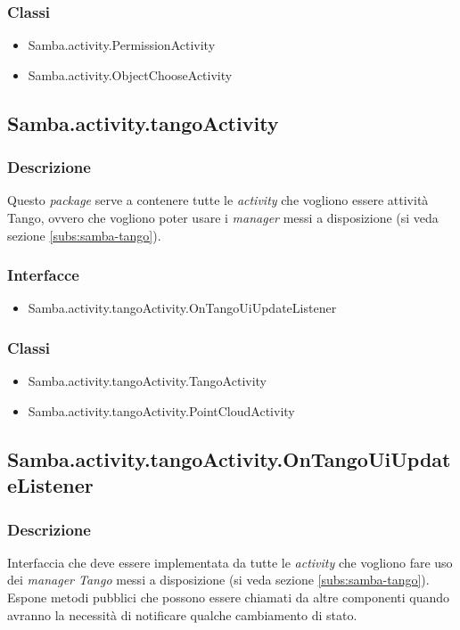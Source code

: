 \subsubsection{Classi}
\begin{itemize}
	\item Samba.activity.PermissionActivity
	\item Samba.activity.ObjectChooseActivity
\end{itemize}

\subsection{Samba.activity.tangoActivity}
\subsubsection{Descrizione}
Questo \emph{package} serve a contenere tutte le \emph{activity} che vogliono essere attività Tango, ovvero che vogliono poter usare i \emph{manager} messi a disposizione (si veda sezione \ref{subs:samba-tango}).
\subsubsection{Interfacce}
\begin{itemize}
	\item Samba.activity.tangoActivity.OnTangoUiUpdateListener
\end{itemize}
\subsubsection{Classi}
\begin{itemize}
	\item Samba.activity.tangoActivity.TangoActivity
	\item Samba.activity.tangoActivity.PointCloudActivity
\end{itemize}

\subsection{Samba.activity.tangoActivity.OnTangoUiUpdateListener}
\subsubsection{Descrizione}
Interfaccia che deve essere implementata da tutte le \emph{activity} che vogliono fare uso dei \emph{manager Tango} messi a disposizione (si veda sezione \ref{subs:samba-tango}). Espone metodi pubblici che possono essere chiamati da altre componenti quando avranno la necessità di notificare qualche cambiamento di stato.
